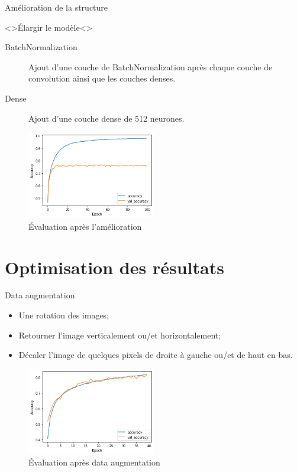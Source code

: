 \documentclass[10pt,handout]{beamer}
\newif\ifplacelogo %
\begin{document}
\begin{frame}{Amélioration de la structure}

\begin{block}<>{Élargir le modèle}<>
    \begin{description}
        \item[BatchNormalization] Ajout d'une couche de BatchNormalization après chaque couche de convolution ainsi que les couches denses.
        \item[Dense] Ajout d'une couche dense de 512 neurones.
    \end{description}
\end{block}

\begin{figure}
    \centering
    \includegraphics[width=0.5\textwidth]{img/Model1_without_dataug_acc.png}
    \caption{Évaluation après l'amélioration}
\end{figure}
\end{frame}


\section{Optimisation des résultats}
\placelogofalse
\begin{frame}{Data augmentation}
    \begin{itemize}
        \item Une rotation des images;
        \item Retourner l'image verticalement ou/et horizontalement;
        \item Décaler l'image de quelques pixels de droite à gauche ou/et de haut en bas.
    \end{itemize}
    \begin{figure}
        \centering
        \includegraphics[width=0.5\textwidth]{img/with_data_aug_acc.png}
        \caption{Évaluation après data augmentation}
    \end{figure}
\end{frame}
\end{document}
